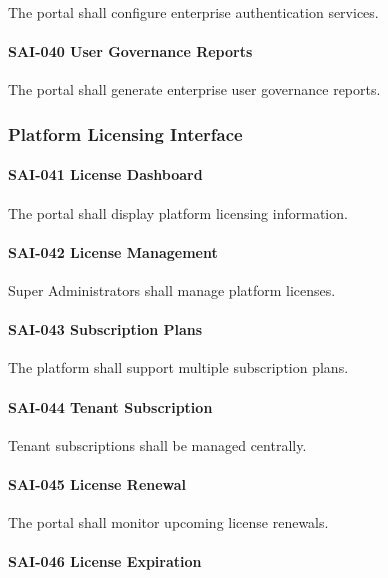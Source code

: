 The portal shall configure enterprise authentication services.

\paragraph{SAI-040 User Governance Reports}

The portal shall generate enterprise user governance reports.


\subsubsection*{Platform Licensing Interface}

\paragraph{SAI-041 License Dashboard}

The portal shall display platform licensing information.

\paragraph{SAI-042 License Management}

Super Administrators shall manage platform licenses.

\paragraph{SAI-043 Subscription Plans}

The platform shall support multiple subscription plans.

\paragraph{SAI-044 Tenant Subscription}

Tenant subscriptions shall be managed centrally.

\paragraph{SAI-045 License Renewal}

The portal shall monitor upcoming license renewals.

\paragraph{SAI-046 License Expiration}

